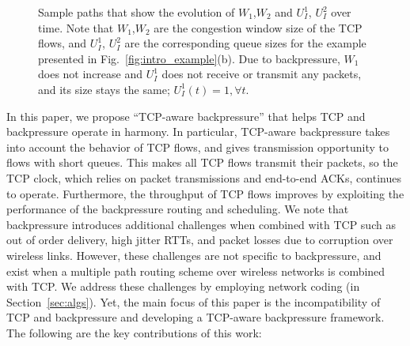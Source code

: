 \documentclass[conference]{IEEEtran}
\begin{document}
\begin{figure}
\vspace{-10pt}
\centering
{}
\vspace{-5pt}
\caption{\scriptsize Sample paths that show the evolution of $W_1$,$W_2$ and $U_{I}^{1}$, $U_{I}^{2}$ over time. Note that $W_1$,$W_2$ are the congestion window size of the TCP flows, and  $U_{I}^{1}$, $U_{I}^{2}$ are the corresponding queue sizes for the example presented in Fig.~\ref{fig:intro_example}(b). Due to backpressure, $W_1$ does not increase and $U_{I}^{1}$ does not receive or transmit any packets, and its size stays the same; $U_{I}^{1}(t) = 1, \forall t$.}
\label{fig:window_queue_evolution}
\vspace{-20pt}
\end{figure}


In this paper, we propose ``TCP-aware backpressure'' that helps TCP and backpressure operate in harmony. In particular, TCP-aware backpressure takes into account the behavior of TCP flows, and gives transmission opportunity to flows with short queues. This makes all TCP flows transmit their packets, so the TCP clock, which relies on packet transmissions and end-to-end ACKs, continues to operate. Furthermore, the throughput of TCP flows improves by exploiting the performance of the backpressure routing and scheduling. We note that backpressure introduces additional challenges when combined with TCP such as out of order delivery, high jitter RTTs, and packet losses due to corruption over wireless links. However, these challenges are not specific to backpressure, and exist when a multiple path routing scheme over wireless networks is combined with TCP. We address these challenges by employing network coding (in Section~\ref{sec:algs}). Yet, the main focus of this paper is the incompatibility of TCP and backpressure and developing a TCP-aware backpressure framework. The following are the key contributions of this work:
\end{document}
